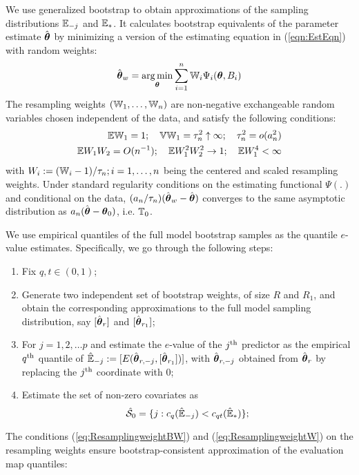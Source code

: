 We use generalized bootstrap \citep{ChatterjeeBose05} to obtain approximations of the sampling distributions ${\mathbb{E}}_{-j}$ and ${\mathbb{E}}_*$. It calculates bootstrap equivalents of the parameter estimate $\hat {{\boldsymbol{\theta}}}$ by minimizing a version of the estimating equation in (\ref{eqn:EstEqn}) with random weights:
%
\begin{align}
\hat {{\boldsymbol{\theta}}}_w = \operatorname*{arg\,min}_{ {\boldsymbol{\theta}}} \sum_{i=1}^n {\mathbb{W}}_{i} \Psi_i  ( {\boldsymbol{\theta}}, B_i)
\end{align}
%
The resampling weights $({\mathbb{W}}_{1}, \ldots, {\mathbb{W}}_{n})$ are non-negative exchangeable random variables chosen independent of the data, and satisfy the following conditions:
%
\begin{eqnarray}
{\mathbb{E}} {\mathbb{W}}_1  = 1; \quad
{\mathbb{V}} {\mathbb{W}}_1  = \tau_{n}^{2} \uparrow \infty; \quad
\tau_n^{2} 
= o ( a_n^{2})\label{eq:ResamplingweightBW}\\
{\mathbb{E}} W_{1} W_{2} = O (n^{-1}); \quad
{\mathbb{E}} W_{1}^{2} W_{2}^{2} \rightarrow 1; \quad
{\mathbb{E}} W_{1}^{4} < \infty \label{eq:ResamplingweightW}
\end{eqnarray}
%
with $W_i := ({\mathbb{W}}_i - 1)/ \tau_n; i = 1, \ldots, n$ being the centered and scaled resampling weights. Under standard regularity conditions on the estimating functional $\Psi(.)$ \citep{ChatterjeeBose05, MajumdarChatterjee17} and conditional on the data, $(a_n/\tau_n) (\hat {{\boldsymbol{\theta}}}_w - \hat {{\boldsymbol{\theta}}})$ converges to the same asymptotic distribution as $a_n ( \hat {{\boldsymbol{\theta}}} - {\boldsymbol{\theta}}_0 )$, i.e. ${\mathbb{T}}_0$.

We use empirical quantiles of the full model bootstrap samples as the quantile $e$-value estimates. Specifically, we go through the following steps:
%
\begin{enumerate}
\item Fix $q,t \in (0,1)$;

\item Generate two independent set of bootstrap weights, of size $R$ and $R_1$, and obtain the corresponding approximations to the full model sampling distribution, say $[ \hat{{\boldsymbol{\theta}}}_{r} ]$ and $[ \hat{{\boldsymbol{\theta}}}_{r_1} ]$;

\item For $j = 1,2,\ldots p$ and estimate the $e$-value of the $j^{\operatorname*{\text{th}}}$ predictor as the empirical $q^{\operatorname*{\text{th}}}$ quantile of $\hat {{\mathbb{E}}}_{-j} := [ E( \hat {{\boldsymbol{\theta}}}_{r,-j}, [ \hat {{\boldsymbol{\theta}}}_{r_1}]) ]$, with $\hat {{\boldsymbol{\theta}}}_{r,-j}$ obtained from $\hat {{\boldsymbol{\theta}}}_{r}$ by replacing the $j^{\operatorname*{\text{th}}}$ coordinate with 0;

\item Estimate the set of non-zero covariates as
%
$$
\hat {{\cal{S}}}_{0} = \lbrace j: c_q (\hat{{\mathbb{E}}}_{-j}) <  c_{q t} (\hat{{\mathbb{E}}}_{*}) \};
$$
\end{enumerate}
%
The conditions (\ref{eq:ResamplingweightBW}) and (\ref{eq:ResamplingweightW}) on the resampling weights ensure bootstrap-consistent approximation of the evaluation map quantiles:
%
%

